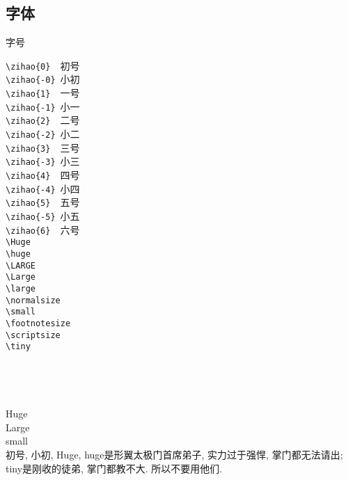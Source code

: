 \documentclass[hyperref,UTF8,11pt]{beamer}
\begin{document}
\subsection{字体}
\begin{frame}[fragile]{字号}
	\begin{multicols}{3}
		\verb|\zihao{0} |~初号\\
		\verb|\zihao{-0}|~小初\\
		\verb|\zihao{1} |~一号\\
		\verb|\zihao{-1}|~小一\\
		\verb|\zihao{2} |~二号\\
		\verb|\zihao{-2}|~小二\\
		\verb|\zihao{3} |~三号\\
		\verb|\zihao{-3}|~小三\\
		\verb|\zihao{4} |~四号\\
		\verb|\zihao{-4}|~小四\\
		\verb|\zihao{5} |~五号\\
		\verb|\zihao{-5}|~小五\\
		\verb|\zihao{6} |~六号\\
		\newpage
		\verb|\Huge|\\
		\verb|\huge|\\
		\verb|\LARGE|\\
		\verb|\Large|\\
		\verb|\large|\\
		\verb|\normalsize|\\
		\verb|\small|\\
		\verb|\footnotesize|\\
		\verb|\scriptsize|\\
		\verb|\tiny|\\
		\newpage
		\\
		\\
		\\
		\\
		\Huge{Huge}\\
		\Large{Large}\\
		\small{small}\\
		\footnotesize 初号, 小初, Huge, huge是形翼太极门首席弟子, 实力过于强悍, 掌门都无法请出; tiny是刚收的徒弟, 掌门都教不大. 所以不要用他们.
	\end{multicols}
\end{frame}
	
\end{document}
